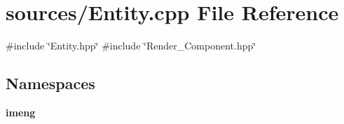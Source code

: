 \section{sources/\+Entity.cpp File Reference}
\label{_entity_8cpp}
{\ttfamily \#include \char`\"{}Entity.\+hpp\char`\"{}}\newline
{\ttfamily \#include \char`\"{}Render\+\_\+\+Component.\+hpp\char`\"{}}\newline
\subsection*{Namespaces}
\begin{DoxyCompactItemize}
\item 
 \textbf{ imeng}
\end{DoxyCompactItemize}
